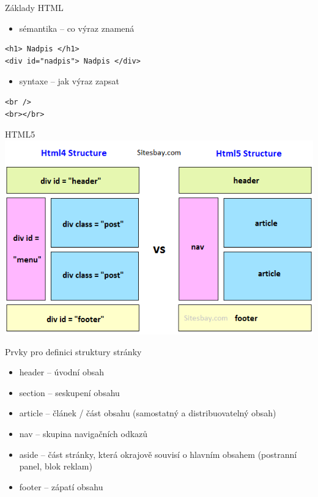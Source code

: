 \documentclass{beamer}
\begin{document}
\begin{frame}[fragile]{Základy HTML}

\begin{itemize}
	\item sémantika -- co výraz znamená

\end{itemize}
\begin{lstlisting}[language=HTML5]
<h1> Nadpis </h1>
<div id="nadpis"> Nadpis </div>
\end{lstlisting}
	
	\begin{itemize}

	\item syntaxe -- jak výraz zapsat
\end{itemize}
\begin{lstlisting}[language=HTML5]
<br />
<br></br>
\end{lstlisting}

\end{frame}

\begin{frame}{HTML5}
	  \includegraphics[width=\columnwidth]{html4-vs-html5}
\end{frame}


\begin{frame}{Prvky pro definici struktury stránky}
	\begin{itemize}
		\item header -- úvodní obsah
		\item section -- seskupení obsahu
		\item article -- článek / část obsahu (samostatný a distribuovatelný obsah)
		\item nav -- skupina navigačních odkazů
		\item aside -- část stránky, která okrajově souvisí o hlavním obsahem (postranní panel, blok reklam)
		\item footer -- zápatí obsahu 
	\end{itemize}
\end{frame}
\end{document}
